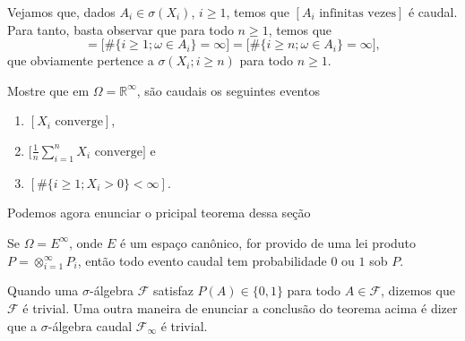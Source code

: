 Vejamos que, dados $A_i \in \sigma(X_i)$, $i \geq 1$, temos que $[A_i \text{ infinitas vezes}]$ é caudal.
Para tanto, basta observar que para todo $n \geq 1$, temos que
\begin{equation*}
  [A_i \text{ infinitas vezes}] = \big[\#\{i \geq 1; \omega \in A_i\} = \infty\big] = \big[\#\{i \geq n; \omega \in A_i\} = \infty\big],
\end{equation*}
que obviamente pertence a $\sigma(X_i; i \geq n)$ para todo $n \geq 1$.

\begin{exercise}
  Mostre que em $\Omega = \mathbb{R}^{\infty}$, são caudais os seguintes eventos
  \begin{enumerate}[\quad a)]
  \item $[X_i \text{ converge}]$,
  \item $\big[\tfrac{1}{n} \sum_{i=1}^n X_i \text{ converge}\big]$ e
  \item $[\#\{i \geq 1; X_i > 0\} < \infty]$.
  \end{enumerate}
\end{exercise}

Podemos agora enunciar o pricipal teorema dessa seção

\begin{theorem}
  Se $\Omega = E^{\infty}$, onde $E$ é um espaço canônico, for provido de uma lei produto $P = \otimes_{i=1}^\infty P_i$, então todo evento caudal tem probabilidade $0$ ou $1$ sob $P$.
\end{theorem}

Quando uma $\sigma$-álgebra $\mathcal{F}$ satisfaz $P(A) \in \{0,1\}$ para todo $A \in \mathcal{F}$, dizemos que $\mathcal{F}$ é trivial. 
Uma outra maneira de enunciar a conclusão do teorema acima é dizer que a $\sigma$-álgebra caudal $\mathcal{F}_\infty$ é trivial.

